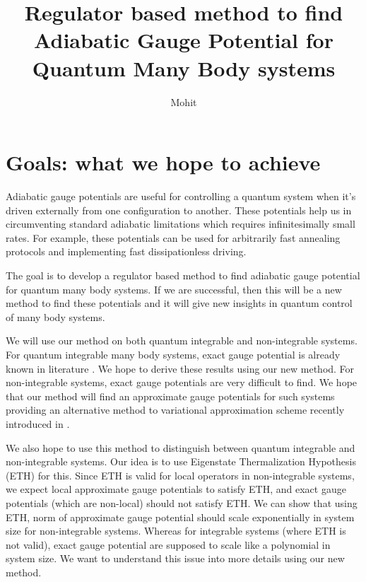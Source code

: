 \documentclass[11pt,a4paper]{article}
\author{Mohit}
\title{Regulator based method to find Adiabatic Gauge Potential for Quantum Many Body systems }
\begin{document}
\maketitle

\section{Goals: what we hope to achieve}


Adiabatic gauge potentials are useful for controlling a quantum system when it's driven externally from one configuration to another. These potentials help us in  circumventing standard adiabatic limitations which requires infinitesimally small rates. For example, these potentials can be used for arbitrarily fast annealing protocols and implementing fast dissipationless driving. 


The goal is to develop a regulator based method to find adiabatic gauge potential for quantum many body systems. If we are successful, then this will be a new method to find these potentials and it will give new insights in quantum control of many body systems. 

We will use our method on both quantum integrable and non-integrable systems. For quantum integrable many body systems, exact gauge potential is already known in literature \cite{del2012assisted, kolodrubetz2016geometry}. We hope to derive these results using our new method. For non-integrable systems, exact gauge potentials are very difficult to find. We hope that our method will find an approximate gauge potentials for such systems providing an alternative method to variational approximation scheme recently introduced in \cite{del2012assisted}.

We also hope to use this method to distinguish between quantum integrable and non-integrable systems. Our idea is to use  Eigenstate Thermalization Hypothesis (ETH) for this. Since ETH is valid for local operators in non-integrable systems, we expect local approximate gauge potentials to satisfy ETH, and exact gauge potentials (which are non-local) should not satisfy ETH. We can show that  using ETH, norm of approximate gauge potential should scale exponentially in system size for non-integrable systems. Whereas for integrable systems (where ETH is not valid), exact gauge potential are supposed to scale like a polynomial in system size. We want to understand this issue into more details using our new method.


\end{document}
